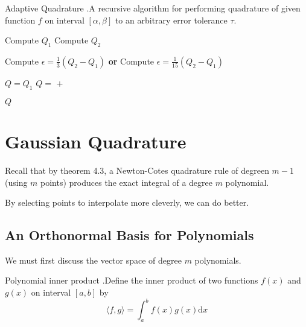 \documentclass[12pt,letterpaper]{article}
\newcommand{\dd}{\mathrm{d}}
\begin{document}
\begin{algo}{Adaptive Quadrature}
.A recursive algorithm for performing quadrature of given function $f$ on interval $[\alpha, \beta]$ to an arbitrary error tolerance $\tau$.

\begin{algorithm}[H]
\caption{Adaptive Quadrature}
\begin{algorithmic}[1]
\Statex
{}
\State Compute $Q_1$ 
\State Compute $Q_2$ 
\item[]
\State Compute $\epsilon = \frac{1}{3} (Q_2 - Q_1)$ 
\State \textbf{or}
\State Compute $\epsilon = \frac{1}{15} (Q_2 - Q_1)$ 
\item[]
\If{$\epsilon \leq \tau$}
\State $Q = Q_1$
\Else
\State $Q = $  $ + $ 
\EndIf
\item[]
\State \Return $Q$
\EndFunction
\end{algorithmic}
\end{algorithm}
\label{alg:adaptq}
\end{algo}

\section{Gaussian Quadrature}

Recall that by theorem 4.3, a Newton-Cotes quadrature rule of degreen $m-1$ (using $m$ points) produces the exact integral of a degree $m$ polynomial.

By selecting points to interpolate more cleverly, we can do better.

\subsection{An Orthonormal Basis for Polynomials}
We must first discuss the vector space of degree $m$ polynomials.

\begin{defn}{Polynomial inner product}
.Define the inner product of two functions $f(x)$ and $g(x)$ on interval $[a,b]$ by
\begin{equation}
	\langle f, g \rangle = \int_a^b f(x) g(x) \dd x
\end{equation}
\label{defn:poly_inner_prod}
\end{defn}
\end{document}
